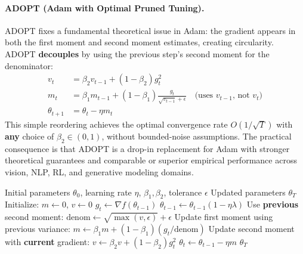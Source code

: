 \documentclass[11pt,a4paper]{article}
\begin{document}
\paragraph{ADOPT (Adam with Optimal Pruned Tuning).}
ADOPT fixes a fundamental theoretical issue in Adam: the gradient appears in both the first moment and second moment estimates, creating circularity. ADOPT \textbf{decouples} by using the previous step's second moment for the denominator:
\begin{align}
v_t &= \beta_2 v_{t-1} + (1-\beta_2)g_t^2 \\
m_t &= \beta_1 m_{t-1} + (1-\beta_1)\frac{g_t}{\sqrt{v_{t-1}}+\epsilon} \quad\text{(uses $v_{t-1}$, not $v_t$)} \\
\theta_{t+1} &= \theta_t - \eta m_t
\end{align}
This simple reordering achieves the optimal convergence rate $O(1/\sqrt{T})$ with \textbf{any} choice of $\beta_2 \in (0,1)$, without bounded-noise assumptions. The practical consequence is that ADOPT is a drop-in replacement for Adam with stronger theoretical guarantees and comparable or superior empirical performance across vision, NLP, RL, and generative modeling domains.

\begin{algorithm}[H]
\caption{ADOPT (Adam with Optimal Pruned Tuning)}
\label{alg:adopt}
\begin{algorithmic}[1]
\Require Initial parameters $\theta_0$, learning rate $\eta$, $\beta_1, \beta_2$, tolerance $\epsilon$
\Ensure Updated parameters $\theta_T$
\State Initialize: $m \gets 0$, $v \gets 0$
    \State $g_t \gets \nabla f(\theta_{t-1})$
        \State $\theta_{t-1} \gets \theta_{t-1}(1 - \eta\lambda)$
    \EndIf
    \State Use \textbf{previous} second moment: $\text{denom} \gets \sqrt{\max(v, \epsilon)} + \epsilon$
    \State Update first moment using previous variance: $m \gets \beta_1 m + (1-\beta_1)(g_t / \text{denom})$
    \State Update second moment with \textbf{current} gradient: $v \gets \beta_2 v + (1-\beta_2) g_t^2$
    \State $\theta_t \gets \theta_{t-1} - \eta m$
\EndFor
\Return $\theta_T$
\end{algorithmic}
\end{algorithm}
\end{document}
